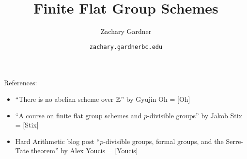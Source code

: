 \documentclass[11pt]{article}
\begin{document}
\title{Finite Flat Group Schemes}
\author{Zachary Gardner}
\date{\texttt{zachary.gardner\@ bc.edu}}
\maketitle

References:
\begin{itemize}
\item ``There is no abelian scheme over $\mathbb{Z}$'' by Gyujin Oh = [Oh]
\item ``A course on finite flat group schemes and $p$-divisible groups'' by Jakob Stix = [Stix]
\item Hard Arithmetic blog post ``$p$-divisible groups, formal groups, and the Serre-Tate theorem'' by Alex Youcis = [Youcis]
\end{itemize}
\end{document}

